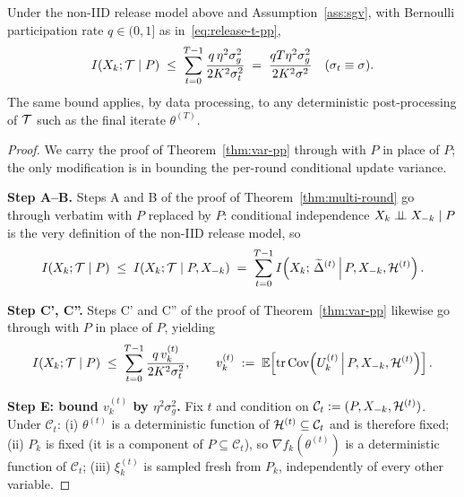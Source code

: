 \begin{theorem}\label{thm:non-iid}
Under the non-IID release model above and Assumption~\ref{ass:sgv}, with Bernoulli participation rate \(q\in(0,1]\) as in~\eqref{eq:release-t-pp},
\begin{equation}\label{eq:non-iid-bd}
I(X_k;\mathcal{T}\mid P) \;\le\; \sum_{t=0}^{T-1}\frac{q\,\eta^2\sigma_g^2}{2K^2\sigma_t^2}\;=\;\frac{qT\eta^2\sigma_g^2}{2K^2\sigma^2}\quad(\sigma_t\equiv\sigma).
\end{equation}
The same bound applies, by data processing, to any deterministic post-processing of \(\mathcal{T}\) such as the final iterate \(\theta^{(T)}\).
\end{theorem}

\begin{proof}
We carry the proof of Theorem~\ref{thm:var-pp} through with \(P\) in place of \(P\); the only modification is in bounding the per-round conditional update variance.

\textbf{Step A--B.} Steps A and B of the proof of Theorem~\ref{thm:multi-round} go through verbatim with \(P\) replaced by \(P\): conditional independence \(X_k\perp\!\!\!\perp X_{-k}\mid P\) is the very definition of the non-IID release model, so
\[
I(X_k;\mathcal{T}\mid P)\;\le\;I(X_k;\mathcal{T}\mid P,X_{-k})\;=\;\sum_{t=0}^{T-1}I\!\left(X_k;\,\widetilde{\Delta}^{(t)}\,\middle|\,P,X_{-k},\mathcal{H}^{(t)}\right).
\]

\textbf{Step C', C''.} Steps C' and C'' of the proof of Theorem~\ref{thm:var-pp} likewise go through with \(P\) in place of \(P\), yielding
\begin{equation}\label{eq:non-iid-pre}
I(X_k;\mathcal{T}\mid P)\;\le\;\sum_{t=0}^{T-1}\frac{q\,v_k^{(t)}}{2K^2\sigma_t^2},
\qquad
v_k^{(t)}\;:=\;\mathbb{E}\!\left[\operatorname{tr}\operatorname{Cov}\!\left(U_k^{(t)}\,\Big|\,P,X_{-k},\mathcal{H}^{(t)}\right)\right].
\end{equation}

\textbf{Step E: bound \(v_k^{(t)}\) by \(\eta^2\sigma_g^2\).}
Fix \(t\) and condition on \(\mathcal C_t:=(P,X_{-k},\mathcal{H}^{(t)})\). Under \(\mathcal C_t\):
(i) \(\theta^{(t)}\) is a deterministic function of \(\mathcal{H}^{(t)}\subseteq\mathcal C_t\) and is therefore fixed;
(ii) \(P_k\) is fixed (it is a component of \(P\subseteq\mathcal C_t\)), so \(\nabla f_k(\theta^{(t)})\) is a deterministic function of \(\mathcal C_t\);
(iii) \(\xi_k^{(t)}\) is sampled fresh from \(P_k\), independently of every other variable.


\end{proof}
